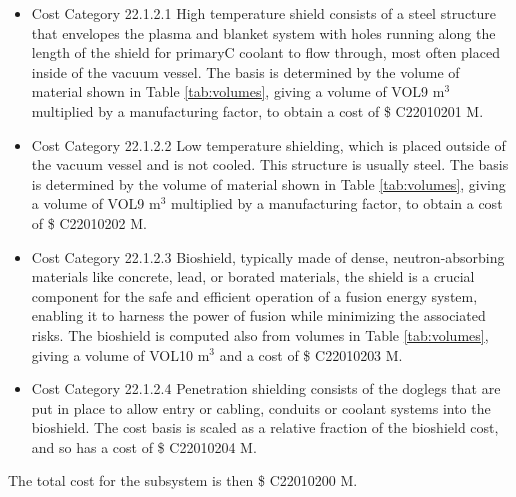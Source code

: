 \begin{itemize}
    \item Cost Category 22.1.2.1 High temperature shield consists of a steel structure that envelopes the plasma and blanket system with holes running along the length of the shield for primaryC coolant to flow through, most often placed inside of the vacuum vessel. The basis is determined by the volume of material shown in Table \ref{tab:volumes}, giving a volume of VOL9  m$^{3}$ multiplied by a manufacturing factor, to obtain a cost of \$ C22010201 M. %
    \item Cost Category 22.1.2.2 Low temperature shielding, which is placed outside of the vacuum vessel and is not cooled.  This structure is usually steel.  The basis is determined by the volume of material shown in Table \ref{tab:volumes}, giving a volume of VOL9  m$^{3}$ multiplied by a manufacturing factor, to obtain a cost of \$ C22010202 M.
    \item Cost Category 22.1.2.3 Bioshield, typically made of dense, neutron-absorbing materials like concrete, lead, or borated materials, the shield is a crucial component for the safe and efficient operation of a fusion energy system, enabling it to harness the power of fusion while minimizing the associated risks.  The bioshield is computed also from volumes in Table \ref{tab:volumes}, giving a volume of VOL10 m$^{3}$ and a cost of \$ C22010203 M. 
    \item Cost Category 22.1.2.4 Penetration shielding consists of the doglegs that are put in place to allow entry or cabling, conduits or coolant systems into the bioshield.  The cost basis is scaled as a relative fraction of the bioshield cost, and so has a cost of \$ C22010204 M.
\end{itemize}

The total cost for the subsystem is then \$ C22010200 M.




